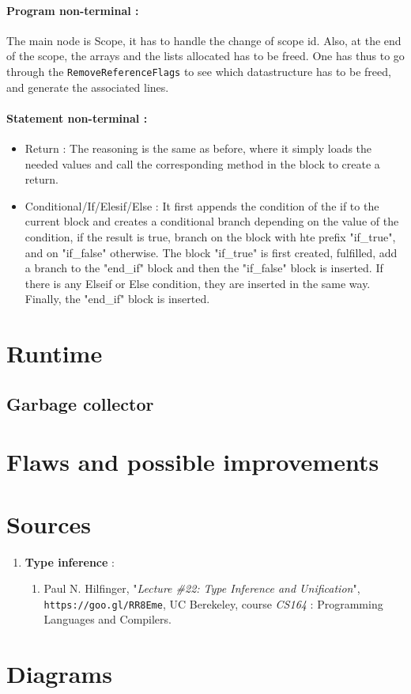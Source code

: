 \documentclass[a4paper,11pt]{article}
\begin{document}
\paragraph{Program non-terminal :} The main node is Scope, it has to handle the change of scope id. Also, at the end of the scope, the arrays and the lists allocated has to be freed. One has thus to go through the \texttt{RemoveReferenceFlags} to see which datastructure has to be freed, and generate the associated lines.

\paragraph{Statement non-terminal :} 

\begin{itemize}
	\item Return : The reasoning is the same as before, where it simply loads the needed values and call the corresponding method in the block to create a return.
	\item Conditional/If/Elesif/Else : It first appends the condition of the if to the current block and creates a conditional branch depending on the value of the condition, if the result is true, branch on the block with hte prefix "if\_true", and on "if\_false" otherwise. The block "if\_true" is first created, fulfilled, add a branch to the "end\_if" block and then the "if\_false" block is inserted. If there is any Elseif or Else condition, they are inserted in the same way. Finally, the "end\_if" block is inserted.
\end{itemize}


\section{Runtime}
\subsection{Garbage collector}
\label{ssec:garabage_collector}

\section{Flaws and possible improvements}

\appendix
\section{Sources}
\begin{enumerate}
	\item \textbf{Type inference} :
	\begin{enumerate}
		\item\label{enum:inference_unification} Paul N. Hilfinger, "\textit{Lecture \#22: Type Inference and Unification}", \texttt{https://goo.gl/RR8Eme}, UC Berekeley, course \textit{CS164} : Programming Languages and Compilers.
	\end{enumerate}
\end{enumerate}
\section{Diagrams}
\end{document}
